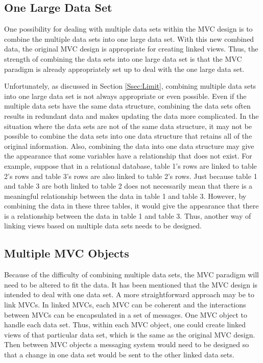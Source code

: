 \documentclass{article}[11pt]
\begin{document}
\subsection{One Large Data Set}\label{Ssec:OneDS}

One possibility for dealing with multiple data sets within the MVC design is to
combine the multiple data sets into one large data set.  With this new
combined data, the original MVC design is appropriate for creating linked
views.  Thus, the strength of combining the data sets into one large data set
is that the MVC paradigm is already appropriately set up to deal with the
one large data set. 

Unfortunately, as discussed in Section \ref{Ssec:Limit}, combining
multiple data sets into one large data set is not always appropriate or even
possible.  Even if the multiple data sets have the same data structure,
combining the data sets often results in redundant data and makes updating the
data more complicated.  In the situation where the data sets are not of the
same data structure, it may not be possible to combine the data sets into one
data structure that retains all of the original information.  Also, combining
the data into one data structure may give the appearance that some variables
have a relationship that does not exist.  For example, suppose that in a
relational database, table 1's rows are linked to table 2's rows and table 3's
rows are also linked to table 2's rows.  Just because table 1 and table 3 are
both linked to table 2 does not necessarily mean that there is a meaningful
relationship between the data in table 1 and table 3.  However, by combining
the data in these three tables, it would give the appearance that there is a
relationship between the data in table 1 and table 3.  Thus, another
way of linking views based on multiple data sets needs to be designed.

\subsection{Multiple MVC Objects}\label{Ssec:MMVC}

Because of the difficulty of combining multiple data sets, the MVC paradigm
will need to be altered to fit the data.  It has been mentioned that the MVC
design is intended to deal with one data set.  A more straightforward approach
may be to link MVCs.  In linked MVCs, each MVC can be coherent and the
interactions between MVCs can be encapsulated in a set of messages.  One MVC
object to handle each data set.  Thus, within each MVC object, one could
create linked views of that particular data set, which is the same as the
original MVC design.  Then between MVC objects a messaging system would need
to be designed so that a change in one data set would be sent to the other
linked data sets.  
\end{document}
